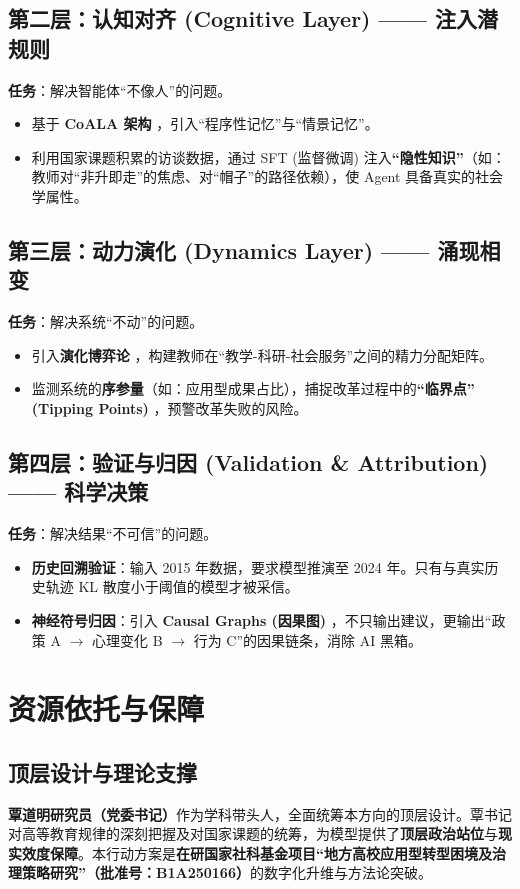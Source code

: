 \documentclass[12pt,a4paper,fontset=mac]{ctexart}
\begin{document}
\subsection*{第二层：认知对齐 (Cognitive Layer) —— 注入潜规则}
\textbf{任务}：解决智能体“不像人”的问题。
\begin{itemize}
    \item 基于 \textbf{CoALA 架构} \cite{sumers2023cognitive}，引入“程序性记忆”与“情景记忆”。
    \item 利用国家课题积累的访谈数据，通过 SFT (监督微调) 注入\textbf{“隐性知识”}（如：教师对“非升即走”的焦虑、对“帽子”的路径依赖），使 Agent 具备真实的社会学属性\cite{granovetter1985economic}。
\end{itemize}

\subsection*{第三层：动力演化 (Dynamics Layer) —— 涌现相变}
\textbf{任务}：解决系统“不动”的问题。
\begin{itemize}
    \item 引入\textbf{演化博弈论} \cite{nowak2006evolutionary}，构建教师在“教学-科研-社会服务”之间的精力分配矩阵。
    \item 监测系统的\textbf{序参量}（如：应用型成果占比），捕捉改革过程中的\textbf{“临界点” (Tipping Points)} \cite{scheffer2009early}，预警改革失败的风险。
\end{itemize}

\subsection*{第四层：验证与归因 (Validation \& Attribution) —— 科学决策}
\textbf{任务}：解决结果“不可信”的问题。
\begin{itemize}
    \item \textbf{历史回溯验证}：输入 2015 年数据，要求模型推演至 2024 年。只有与真实历史轨迹 KL 散度小于阈值的模型才被采信。
    \item \textbf{神经符号归因}：引入 \textbf{Causal Graphs (因果图)} \cite{pearl2018book}，不只输出建议，更输出“政策 A $\to$ 心理变化 B $\to$ 行为 C”的因果链条，消除 AI 黑箱。
\end{itemize}

\section{资源依托与保障}

\subsection{顶层设计与理论支撑}
\textbf{覃道明研究员（党委书记）}作为学科带头人，全面统筹本方向的顶层设计。覃书记对高等教育规律的深刻把握及对国家课题的统筹，为模型提供了\textbf{顶层政治站位}与\textbf{现实效度保障}。本行动方案是\textbf{在研国家社科基金项目“地方高校应用型转型困境及治理策略研究”（批准号：B1A250166）}的数字化升维与方法论突破。
\end{document}
